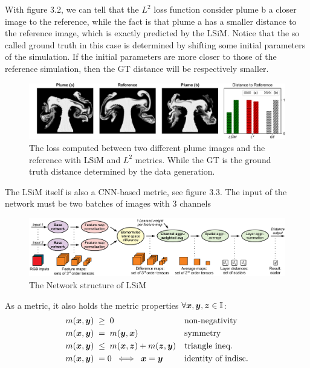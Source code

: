 \documentclass[a4paper,12pt,twoside]{report}
\begin{document}
With figure 3.2, we can tell that the $L^2$ loss function consider plume b a closer image to the reference, while the fact is that plume a has a smaller distance to the reference image, which is exactly predicted by the LSiM. Notice that the so called ground truth in this case is determined by shifting some initial parameters of the simulation. If the initial parameters are more closer to those of the reference simulation, then the GT distance will be respectively smaller.

\begin{figure}
\centering
\includegraphics[width=1.0\textwidth]{Plumes.pdf}
\caption{The loss computed between two different plume images and the reference with LSiM and $L^2$ metrics. While the GT is the ground truth distance determined by the data generation.  }
\end{figure}
The LSiM itself is also a CNN-based metric, see figure 3.3. The input of the network must be two batches of images with 3 channels
\begin{figure}
\centering
\includegraphics[width=1.0\textwidth]{DistanceComputation.pdf}
\caption{The Network structure of LSiM}
\end{figure}

As a metric, it also holds the metric properties $\forall {\bm{x}},{\bm{y}},{\bm{z}} \in {\mathbb{I}}$:
\begin{align}
    m({\bm{x}},{\bm{y}}) \; &\geq \; 0                && \text{non-negativity} \label{eq: NonNeg}\\
    m({\bm{x}},{\bm{y}}) \; &= \; m({\bm{y}},{\bm{x}})              && \text{symmetry} \label{eq: Sym}\\
    m({\bm{x}},{\bm{y}}) \; &\leq \; m({\bm{x}},{\bm{z}}) + m({\bm{z}},{\bm{y}})  && \text{triangle ineq.} \label{eq: TriIneq}\\
    m({\bm{x}},{\bm{y}}) \; &= 0 \; \iff \; {\bm{x}} = {\bm{y}}     && \text{identity of indisc.} \label{eq: IoI}
\end{align}
\end{document}
